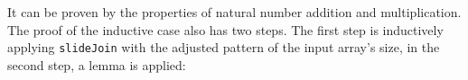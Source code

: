 \documentclass{l4proj}
\begin{document}
\begin{code}%
\>%
\>[235I]\AgdaSymbol{:}\AgdaSpace{}%
\AgdaSymbol{(}\AgdaSpace{}%
\AgdaSpace{}%
\AgdaSpace{}%
\AgdaSpace{}%
\AgdaSymbol{:}\AgdaSpace{}%
\AgdaSymbol{)}\AgdaSpace{}%
\<%
\\
\>[.][@{}l@{}]\<[235I]%
\>[15]\AgdaSpace{}%
\AgdaSymbol{(}\AgdaSpace{}%
\AgdaOperator{\AgdaPrimitive{+}}\AgdaSpace{}%
\AgdaSpace{}%
\AgdaOperator{\AgdaPrimitive{*}}\AgdaSpace{}%
\AgdaSpace{}%
\AgdaSpace{}%
\AgdaOperator{\AgdaPrimitive{+}}\AgdaSpace{}%
\AgdaSymbol{(}\AgdaSpace{}%
\AgdaOperator{\AgdaPrimitive{+}}\AgdaSpace{}%
\AgdaSpace{}%
\AgdaOperator{\AgdaPrimitive{+}}\AgdaSpace{}%
\AgdaSpace{}%
\AgdaOperator{\AgdaPrimitive{*}}\AgdaSpace{}%
\AgdaSpace{}%
\AgdaOperator{\AgdaPrimitive{+}}\AgdaSpace{}%
\AgdaSpace{}%
\AgdaOperator{\AgdaPrimitive{*}}\AgdaSpace{}%
\AgdaSpace{}%
\AgdaSymbol{(}\AgdaSpace{}%
\AgdaOperator{\AgdaPrimitive{+}}\AgdaSpace{}%
\AgdaSpace{}%
\AgdaOperator{\AgdaPrimitive{+}}\AgdaSpace{}%
\AgdaSpace{}%
\AgdaOperator{\AgdaPrimitive{*}}\AgdaSpace{}%
\AgdaSymbol{)))}\AgdaSpace{}%
\<%
\\
%
\>[15]\AgdaSpace{}%
\AgdaSymbol{(}\AgdaSpace{}%
\AgdaOperator{\AgdaPrimitive{+}}\AgdaSpace{}%
\AgdaSpace{}%
\AgdaOperator{\AgdaPrimitive{+}}\AgdaSpace{}%
\AgdaSpace{}%
\AgdaOperator{\AgdaPrimitive{*}}\AgdaSpace{}%
\AgdaSpace{}%
\AgdaOperator{\AgdaPrimitive{+}}\AgdaSpace{}%
\AgdaSymbol{(}\AgdaSpace{}%
\AgdaOperator{\AgdaPrimitive{+}}\AgdaSpace{}%
\AgdaSpace{}%
\AgdaOperator{\AgdaPrimitive{*}}\AgdaSpace{}%
\AgdaSpace{}%
\AgdaSpace{}%
\AgdaOperator{\AgdaPrimitive{+}}\AgdaSpace{}%
\AgdaSpace{}%
\AgdaOperator{\AgdaPrimitive{*}}\AgdaSpace{}%
\AgdaSpace{}%
\AgdaSymbol{(}\AgdaSpace{}%
\AgdaOperator{\AgdaPrimitive{+}}\AgdaSpace{}%
\AgdaSpace{}%
\AgdaOperator{\AgdaPrimitive{+}}\AgdaSpace{}%
\AgdaSpace{}%
\AgdaOperator{\AgdaPrimitive{*}}\AgdaSpace{}%
\AgdaSymbol{)))}\<%
\end{code}
It can be proven by the properties of natural number addition and multiplication. The proof of the inductive case also has two steps. The first step is inductively applying \texttt{slideJoin} with the adjusted pattern of the input array's size, in the second step, a lemma  is applied:
\end{document}
